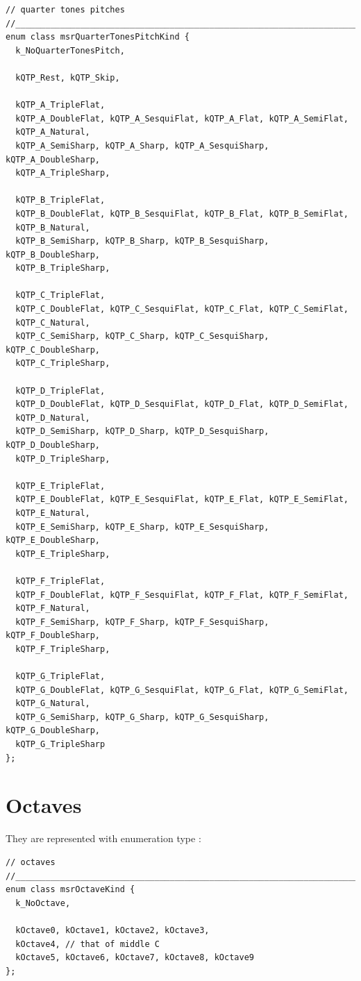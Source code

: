 \begin{lstlisting}[language=CPlusPlus]
// quarter tones pitches
//______________________________________________________________________________
enum class msrQuarterTonesPitchKind {
  k_NoQuarterTonesPitch,

  kQTP_Rest, kQTP_Skip,

  kQTP_A_TripleFlat,
  kQTP_A_DoubleFlat, kQTP_A_SesquiFlat, kQTP_A_Flat, kQTP_A_SemiFlat,
  kQTP_A_Natural,
  kQTP_A_SemiSharp, kQTP_A_Sharp, kQTP_A_SesquiSharp, kQTP_A_DoubleSharp,
  kQTP_A_TripleSharp,

  kQTP_B_TripleFlat,
  kQTP_B_DoubleFlat, kQTP_B_SesquiFlat, kQTP_B_Flat, kQTP_B_SemiFlat,
  kQTP_B_Natural,
  kQTP_B_SemiSharp, kQTP_B_Sharp, kQTP_B_SesquiSharp, kQTP_B_DoubleSharp,
  kQTP_B_TripleSharp,

  kQTP_C_TripleFlat,
  kQTP_C_DoubleFlat, kQTP_C_SesquiFlat, kQTP_C_Flat, kQTP_C_SemiFlat,
  kQTP_C_Natural,
  kQTP_C_SemiSharp, kQTP_C_Sharp, kQTP_C_SesquiSharp, kQTP_C_DoubleSharp,
  kQTP_C_TripleSharp,

  kQTP_D_TripleFlat,
  kQTP_D_DoubleFlat, kQTP_D_SesquiFlat, kQTP_D_Flat, kQTP_D_SemiFlat,
  kQTP_D_Natural,
  kQTP_D_SemiSharp, kQTP_D_Sharp, kQTP_D_SesquiSharp, kQTP_D_DoubleSharp,
  kQTP_D_TripleSharp,

  kQTP_E_TripleFlat,
  kQTP_E_DoubleFlat, kQTP_E_SesquiFlat, kQTP_E_Flat, kQTP_E_SemiFlat,
  kQTP_E_Natural,
  kQTP_E_SemiSharp, kQTP_E_Sharp, kQTP_E_SesquiSharp, kQTP_E_DoubleSharp,
  kQTP_E_TripleSharp,

  kQTP_F_TripleFlat,
  kQTP_F_DoubleFlat, kQTP_F_SesquiFlat, kQTP_F_Flat, kQTP_F_SemiFlat,
  kQTP_F_Natural,
  kQTP_F_SemiSharp, kQTP_F_Sharp, kQTP_F_SesquiSharp, kQTP_F_DoubleSharp,
  kQTP_F_TripleSharp,

  kQTP_G_TripleFlat,
  kQTP_G_DoubleFlat, kQTP_G_SesquiFlat, kQTP_G_Flat, kQTP_G_SemiFlat,
  kQTP_G_Natural,
  kQTP_G_SemiSharp, kQTP_G_Sharp, kQTP_G_SesquiSharp, kQTP_G_DoubleSharp,
  kQTP_G_TripleSharp
};
\end{lstlisting}


\section{Octaves}\label{Octaves}

They are represented with enumeration type {\tt }:
\begin{lstlisting}[language=CPlusPlus]
// octaves
//______________________________________________________________________________
enum class msrOctaveKind {
  k_NoOctave,

  kOctave0, kOctave1, kOctave2, kOctave3,
  kOctave4, // that of middle C
  kOctave5, kOctave6, kOctave7, kOctave8, kOctave9
};
\end{lstlisting}

